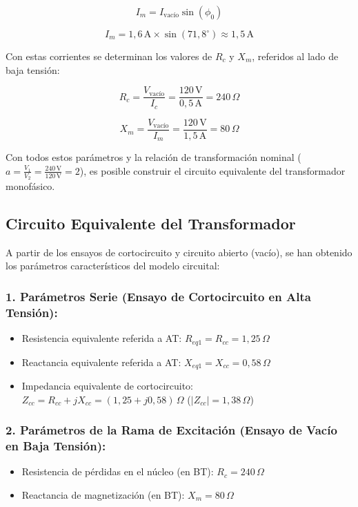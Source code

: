 \begin{equation}
I_m=I_{\text{vacío}}\sin(\phi_0)
\end{equation}

\begin{equation}
I_m=1,6\,\mathrm{A}\times\sin(71,8^{\circ})\approx 1,5\,\mathrm{A}
\end{equation}

Con estas corrientes se determinan los valores de $R_c$ y $X_m$, referidos al lado de baja tensión:

\begin{equation}
R_c=\frac{V_{\text{vacío}}}{I_c}=\frac{120\,\mathrm{V}}{0,5\,\mathrm{A}}=240\,\Omega
\end{equation}

\begin{equation}
X_m=\frac{V_{\text{vacío}}}{I_m}=\frac{120\,\mathrm{V}}{1,5\,\mathrm{A}}=80\,\Omega
\end{equation}

Con todos estos parámetros y la relación de transformación nominal ($a = \frac{V_1}{V_2} = \frac{240\,\mathrm{V}}{120\,\mathrm{V}} = 2$), es posible construir el circuito equivalente del transformador monofásico.

\subsection{Circuito Equivalente del Transformador}

A partir de los ensayos de cortocircuito y circuito abierto (vacío), se han obtenido los parámetros característicos del modelo circuital:

\subsubsection*{1. Parámetros Serie (Ensayo de Cortocircuito en Alta Tensión):}
\begin{itemize}
    \item Resistencia equivalente referida a AT: $R_{eq1} = R_{cc} = 1,25\,\Omega$
    \item Reactancia equivalente referida a AT: $X_{eq1} = X_{cc} = 0,58\,\Omega$
    \item Impedancia equivalente de cortocircuito: $Z_{cc} = R_{cc} + jX_{cc} = (1,25 + j0,58)\,\Omega$ ($|Z_{cc}| = 1,38\,\Omega$)
\end{itemize}

\subsubsection*{2. Parámetros de la Rama de Excitación (Ensayo de Vacío en Baja Tensión):}
\begin{itemize}
    \item Resistencia de pérdidas en el núcleo (en BT): $R_c = 240\,\Omega$
    \item Reactancia de magnetización (en BT): $X_m = 80\,\Omega$
\end{itemize}

